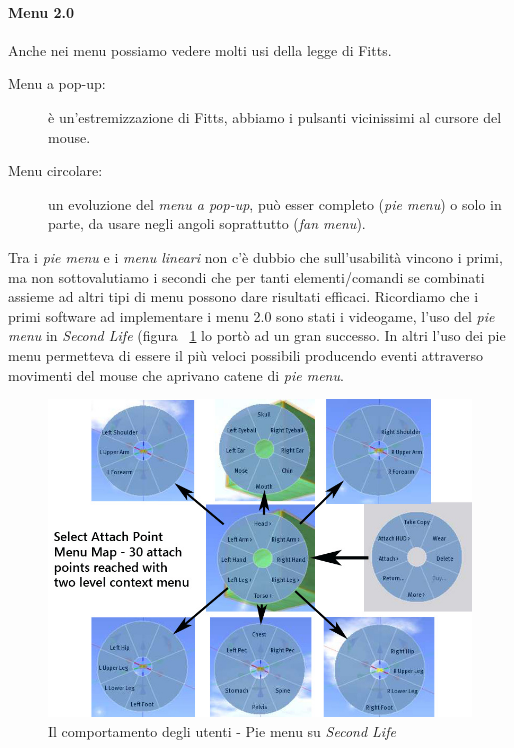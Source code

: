 				\paragraph{Menu 2.0}
					Anche nei menu possiamo vedere molti usi della legge di Fitts.
					\begin{description}
						\item[Menu a pop-up:] è un'estremizzazione di Fitts, abbiamo i pulsanti vicinissimi al cursore del mouse.
						\item[Menu circolare:] un evoluzione del \emph{menu a pop-up}, può esser completo (\emph{pie menu}) o solo in parte, da usare negli angoli soprattutto (\emph{fan menu}).
					\end{description}
					Tra i \emph{pie menu} e i \emph{menu lineari} non c'è dubbio che sull'usabilità vincono i primi, ma non sottovalutiamo i secondi che  per tanti elementi/comandi se combinati assieme ad altri tipi di menu possono dare risultati efficaci.
					Ricordiamo che i primi software ad implementare i menu 2.0 sono stati i videogame, l'uso del \emph{pie menu} in \emph{Second Life} (figura ~\ref{fig:PieMenu} lo portò ad un gran successo. In altri l'uso dei pie menu permetteva di essere il più veloci possibili producendo eventi attraverso movimenti del mouse che aprivano catene di \emph{pie menu}.
				
				\begin{figure}
				\centering
					\includegraphics[scale=0.6]{images/IlComportamentoDegliUtenti-PieMenu}
					\caption{Il comportamento degli utenti - Pie menu su \emph{Second Life}}
					\label{fig:PieMenu}
				\end{figure}